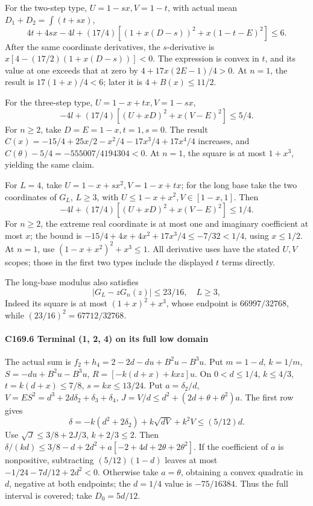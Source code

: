 For the two-step type, \(U=1-sx,\allowbreak \allowbreak  V=1-t\), with actual mean \(D_1+D_2=\int(t+sx)\),
\[
4t+4sx-4l+(17/4)[(1+x(D-s))^2+x(1-t-E)^2]\le6.             \tag{C169.5.3}
\]
After the same coordinate derivatives, the \(s\)-derivative is \(x[4-(17/2)(1+x(D-s))]<0\). The expression is convex in \(t\), and its value at one exceeds that at zero by \(4+17x(2E-1)/4>0\). At \(n=1\), the result is \(17(1+x)/4<6\); later it is \(4+B(x)\le11/2\).

For the three-step type, \(U=1-x+tx,\allowbreak \allowbreak  V=1-sx\),
\[
-4l+(17/4)[(U+xD)^2+x(V-E)^2]\le5/4.                    \tag{C169.5.4}
\]
For \(n\ge2\), take \(D=E=1-x,\allowbreak \allowbreak  t=1,\allowbreak \allowbreak  s=0\). The result \(C(x)=-15/4+25x/2-x^2/4-17x^3/4+17x^4/4\) increases, and \(C(\theta)-5/4=-555007/4194304<0\). At \(n=1\), the square is at most \(1+x^3\), yielding the same claim.

For \(L=4\), take \(U=1-x+sx^2,\allowbreak \allowbreak  V=1-x+tx\); for the long base take the two coordinates of \(G_L\), \(L\ge3\), with \(U\le1-x+x^2,\allowbreak \allowbreak  V\in[1-x,\allowbreak \allowbreak  1]\). Then
\[
-4l+(17/4)[(U+xD)^2+x(V-E)^2]\le1/4.                    \tag{C169.5.5}
\]
For \(n\ge2\), the extreme real coordinate is at most one and imaginary coefficient at most \(x\); the bound is \(-15/4+4x+4x^2+17x^3/4\le-7/32<1/4\), using \(x\le1/2\). At \(n=1\), use \((1-x+x^2)^2+x^3\le1\). All derivative uses have the stated \(U,\allowbreak \allowbreak  V\) scopes; those in the first two types include the displayed \(t\) terms directly.

The long-base modulus also satisfies
\[
|G_L-zG_n(z)|\le23/16,\quad L\ge3,                       \tag{C169.5.6}
\]
Indeed its square is at most \((1+x)^2+x^3\), whose endpoint is \(66997/32768\), while \((23/16)^2=67712/32768\).

\paragraph{C169.6 Terminal (1, 2, 4) on its full low domain}\label{part:C169.6}

The actual sum is \(f_2+h_4=2-2d-du+B^2u-B^3u\). Put \(m=1-d\), \(k=1/m\), \(S=-du+B^2u-B^3u\), \(R=[-k(d+x)+kxz]u\). On \(0<d\le1/4\), \(k\le4/3\), \(t=k(d+x)\le7/8\), \(s=kx\le13/24\). Put \(a=\delta_2/d\), \(V=ES^2=d^3+2d\delta_2+\delta_3+\delta_4\), \(J=V/d\le d^2+(2d+\theta+\theta^2)a\). The first row gives
\[
\delta=-k(d^2+2\delta_2)+k\sqrt{dV}+k^2V\le(5/12)d.           \tag{C169.6.1}\label{eq:C169:6.1}
\]
Use \(\sqrt J\le3/8+2J/3\), \(k+2/3\le2\). Then \(\delta/(kd)\le3/8-d+2d^2+a[-2+4d+2\theta+2\theta^2]\). If the coefficient of \(a\) is nonpositive, subtracting \((5/12)(1-d)\) leaves at most \(-1/24-7d/12+2d^2<0\). Otherwise take \(a=\theta\), obtaining a convex quadratic in \(d\), negative at both endpoints; the \(d=1/4\) value is \(-75/16384\). Thus the full interval is covered; take \(D_0=5d/12\).

